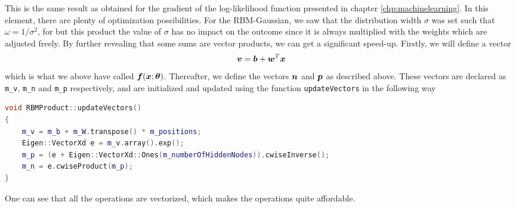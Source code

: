 This is the same result as obtained for the gradient of the log-likelihood function presented in chapter \ref{chp:machinelearning}. In this element, there are plenty of optimization possibilities. For the RBM-Gaussian, we saw that the distribution width $\sigma$ was set such that $\omega=1/\sigma^2$, for but this product the value of $\sigma$ has no impact on the outcome since it is always multiplied with the weights which are adjusted freely. By further revealing that some sums are vector products, we can get a significant speed-up. Firstly, we will define a vector 
\begin{equation}
\boldsymbol{{v}}=\boldsymbol{{b}}+\boldsymbol{{w}}^T\boldsymbol{{x}}
\end{equation}
which is what we above have called $\boldsymbol{{f}}(\boldsymbol{{x}};\boldsymbol{{\theta}})$. Thereafter, we define the vectors $\boldsymbol{{n}}$ and $\boldsymbol{{p}}$ as described above. These vectors are declared as \lstinline|m_v|, \lstinline|m_n| and \lstinline|m_p| respectively, and are initialized and updated using the function \lstinline|updateVectors| in the following way

\begin{lstlisting}[language={c++},caption={Taken from \lstinline|rbmproduct.cpp|.}]
void RBMProduct::updateVectors()
{
	m_v = m_b + m_W.transpose() * m_positions;
	Eigen::VectorXd e = m_v.array().exp();
	m_p = (e + Eigen::VectorXd::Ones(m_numberOfHiddenNodes)).cwiseInverse();
	m_n = e.cwiseProduct(m_p);
}
\end{lstlisting}
One can see that all the operations are vectorized, which makes the operations quite affordable. 

